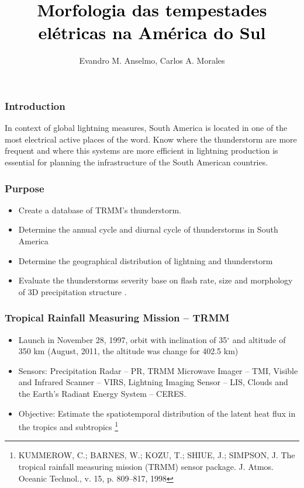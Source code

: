 \documentclass[smaller]{beamer}
\title[DCA--IAG--USP]{\textcolor{black}{Morfologia das tempestades el\'{e}tricas na América do Sul}}
\subtitle{}
\date[]{\begin{footnotesize}IAG/USP -- 2015\end{footnotesize}}
\author[IAG]{Evandro M. Anselmo, Carlos A. Morales}
\institute{Institute of Astronomy, Geophysics and Atmospheric Science of University of São Paulo (IAG-USP), São Paulo-SP, Brazil. \par}
\begin{document}
\begin{frame}
\titlepage
\end{frame}
 
 
 
 
\begin{frame}
\frametitle{Introduction}
In context of global lightning measures, South America is located in one of the most electrical active places of the word. Know where the thunderstorm are more frequent and where this systems are more efficient in lightning production is essential for planning the infrastructure of the South American countries.
\end{frame}


\begin{frame}
\frametitle{Purpose}
\begin{itemize}
\item Create a database of TRMM's thunderstorm.
\item Determine the annual cycle and diurnal cycle of thunderstorms in South America
\item Determine the geographical distribution of lightning and thunderstorm
\item Evaluate the thunderstorms severity base on flash rate, size and morphology of 3D precipitation structure .
\end{itemize}
\end{frame}
  

\begin{frame}
\frametitle{Tropical Rainfall Measuring Mission -- TRMM}
\begin{itemize}
\item Launch in November 28, 1997, orbit with inclination of 35$^{\circ}$ and altitude of 350 km (August, 2011, the altitude was change for 402.5 km)
\item Sensors: Precipitation Radar
-- PR, TRMM Microwave Imager -- TMI, Visible and Infrared Scanner -- VIRS, Lightning Imaging Sensor -- LIS,  Clouds and the Earth’s Radiant Energy System
-- CERES.
\item Objective: Estimate the spatiotemporal distribution of the latent heat flux in the tropics and subtropics \footnote{KUMMEROW, C.; BARNES, W.; KOZU, T.; SHIUE, J.; SIMPSON, J. The tropical
rainfall measuring mission (TRMM) sensor package. J. Atmos. Oceanic Technol., v. 15, p. 809--817, 1998}
\end{itemize}

\end{frame} 
 
\end{document}

